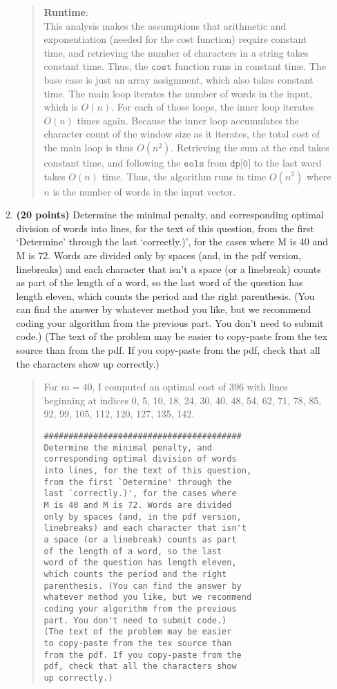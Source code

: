 \documentclass[11pt]{article}
\newcommand{\code}[1]{$\texttt{#1}$}
\begin{document}
\begin{enumerate}
\begin{enumerate}
\begin{quote}
\medskip
\textbf{Runtime}: \\
This analysis makes the assumptions that arithmetic and exponentiation (needed for the cost function) require constant time, and retrieving the number of characters in a string takes constant time. Thus, the \code{cost} function runs in constant time. The base case is just an array assignment, which also takes constant time. The main loop iterates the number of words in the input, which is $O(n)$. For each of those loops, the inner loop iterates $O(n)$ times again. Because the inner loop accumulates the character count of the window size as it iterates, the total cost of the main loop is thus $O(n^2)$. Retrieving the sum at the end takes constant time, and following the \code{eols} from \code{dp[0]} to the last word takes $O(n)$ time. Thus, the algorithm runs in time $O(n^2)$ where $n$ is the number of words in the input vector.
\end{quote}

\item
{\bf (20 points)}
Determine the minimal penalty, and corresponding optimal division of words into lines, for the text of this question, from the first `Determine' through the last `correctly.)', for the cases where M is 40 and M is 72. Words are divided only by spaces (and, in the pdf version, linebreaks) and each character that isn't a space (or a linebreak) counts as part of the length of a word, so the last word of the question has length eleven, which counts the period and the right parenthesis. (You can find the answer by whatever method you like, but we recommend coding your algorithm from the previous part. You don't need to submit code.) (The text of the problem may be easier to copy-paste from the tex source than from the pdf. If you copy-paste from the pdf, check that all the characters show up correctly.)
\begin{quote}
  \color{purple}
  For $m = 40$, I computed an optimal cost of $396$ with lines beginning at indices 0, 5, 10, 18, 24, 30, 40, 48, 54, 62, 71, 78, 85, 92, 99, 105, 112, 120, 127, 135, 142.  
  \begin{verbatim}
########################################
Determine the minimal penalty, and
corresponding optimal division of words
into lines, for the text of this question,
from the first `Determine' through the
last `correctly.)', for the cases where
M is 40 and M is 72. Words are divided
only by spaces (and, in the pdf version,
linebreaks) and each character that isn't
a space (or a linebreak) counts as part
of the length of a word, so the last
word of the question has length eleven,
which counts the period and the right
parenthesis. (You can find the answer by
whatever method you like, but we recommend
coding your algorithm from the previous
part. You don't need to submit code.)
(The text of the problem may be easier
to copy-paste from the tex source than
from the pdf. If you copy-paste from the
pdf, check that all the characters show
up correctly.)
  \end{verbatim}


\end{quote}
\end{enumerate}
\end{enumerate}
\end{document}
